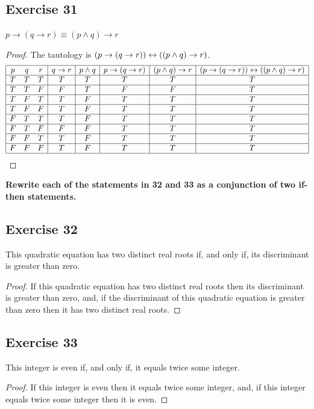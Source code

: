 \documentclass[14pt]{extarticle}
\begin{document}
\subsection{Exercise 31} $p \to (q \to r) \equiv (p \wedge q) \to r$
\begin{proof} The tautology is $(p \to (q \to r)) \leftrightarrow ((p \wedge q) \to r)$. $$
\begin{array}{|ccc|c|c|c|c|c|} \hline p & q & r & q \to r & p \wedge q & p \to
(q \to r) & (p \wedge q) \to r & (p \to (q \to r)) \leftrightarrow ((p \wedge q) \to r) \\
\hline T & T & T & T & T & T & T & T \\ \hline T & T & F & F & T & F & F & T \\
\hline T & F & T & T & F & T & T & T \\ \hline T & F & F & T & F & T & T & T \\
\hline F & T & T & T & F & T & T & T \\ \hline F & T & F & F & F & T & T & T \\
\hline F & F & T & T & F & T & T & T \\ \hline F & F & F & T & F & T & T & T \\
\hline \end{array} $$ \end{proof}

{\bf Rewrite each of the statements in 32 and 33 as a conjunction of two if-then
statements.}

\subsection{Exercise 32} This quadratic equation has two distinct real roots if,
and only if, its discriminant is greater than zero.

\begin{proof} If this quadratic equation has two distinct real roots then its
discriminant is greater than zero, and, if the discriminant of this quadratic
equation is greater than zero then it has two distinct real roots. \end{proof}

\subsection{Exercise 33} This integer is even if, and only if, it equals twice
some integer.

\begin{proof} If this integer is even then it equals twice some integer, and, if
this integer equals twice some integer then it is even. \end{proof}
\end{document}
